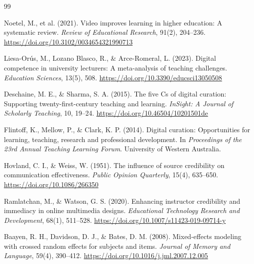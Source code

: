 \documentclass[11pt]{ltjarticle}
\begin{document}
\begin{thebibliography}{99}

Noetel, M., et al. (2021).
Video improves learning in higher education:
A systematic review.
\textit{Review of Educational Research},
91(2), 204--236.
\url{https://doi.org/10.3102/0034654321990713}

Liesa-Orús, M., Lozano Blasco, R.,
\& Arce-Romeral, L. (2023).
Digital competence in university lecturers:
A meta-analysis of teaching challenges.
\textit{Education Sciences}, 13(5), 508.
\url{https://doi.org/10.3390/educsci13050508}

Deschaine, M. E., \& Sharma, S. A. (2015).
The five Cs of digital curation:
Supporting twenty-first-century teaching
and learning.
\textit{InSight: A Journal of Scholarly Teaching},
10, 19--24.
\url{https://doi.org/10.46504/10201501de}

Flintoff, K., Mellow, P.,
\& Clark, K. P. (2014).
Digital curation: Opportunities for learning,
teaching, research and professional development.
In \textit{Proceedings of the 23rd Annual
Teaching Learning Forum}.
University of Western Australia.

Hovland, C. I., \& Weiss, W. (1951).
The influence of source credibility on
communication effectiveness.
\textit{Public Opinion Quarterly},
15(4), 635--650.
\url{https://doi.org/10.1086/266350}

Ramlatchan, M., \& Watson, G. S. (2020).
Enhancing instructor credibility and
immediacy in online multimedia designs.
\textit{Educational Technology Research
and Development}, 68(1), 511--528.
\url{https://doi.org/10.1007/s11423-019-09714-y}

Baayen, R. H., Davidson, D. J.,
\& Bates, D. M. (2008).
Mixed-effects modeling with crossed
random effects for subjects and items.
\textit{Journal of Memory and Language},
59(4), 390--412.
\url{https://doi.org/10.1016/j.jml.2007.12.005}

\end{thebibliography}
\end{document}

